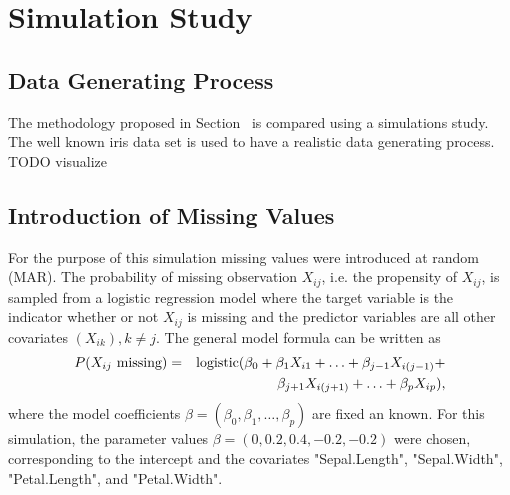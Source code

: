 \documentclass[12pt, twoside]{article}
\newcommand{\1}{\mathbb{1}}
\begin{document}


\section{Simulation Study}

\subsection{Data Generating Process}
The methodology proposed in Section~\label{treatment_of_missing_values_in_cart} is compared using a simulations study. The well known iris data set \citep{iris} is used to have a realistic data generating process. 
TODO visualize

\subsection{Introduction of Missing Values}
For the purpose of this simulation missing values were introduced at random (MAR). The probability of missing observation $X_{ij}$, i.e. the propensity of $X_{ij}$, is sampled from a logistic regression model where the target variable is the indicator whether or not $X_{ij}$ is missing and the predictor variables are all other covariates $(X_{ik}), k \neq j$. The general model formula can be written as
\begin{eqnarray}
P(X_{ij} \text{ missing}) &=& \text{logistic}(\beta_0 + \beta_1 X_{i1} + \ldots + \beta_{j - 1} X_{i(j - 1)} + \nonumber \\
&& \hspace{1.4cm}  \beta_{j + 1} X_{i(j + 1)} + \ldots + \beta_p X_{ip}),
\end{eqnarray}
where the model coefficients $\beta = (\beta_0, \beta_1, \ldots, \beta_p)$ are fixed an known.
For this simulation, the parameter values $\beta = (0, 0.2, 0.4, -0.2, -0.2)$ were chosen, corresponding to the intercept and the covariates "Sepal.Length", "Sepal.Width", "Petal.Length", and "Petal.Width".
\end{document}
